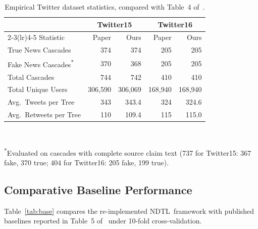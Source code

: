 \documentclass[10pt,twocolumn,a4paper]{article}
\newcommand{\NDTL}{\textsc{NDTL}}
\begin{document}
\begin{table}[t]
\centering
\caption{Empirical Twitter dataset statistics, compared with Table~4 of~\cite{fionda2025}.}
\label{tab:data}
\scriptsize
\setlength{\tabcolsep}{2.5pt}
\begin{tabular}{lrrrr}
\toprule
 & \multicolumn{2}{c}{Twitter15} & \multicolumn{2}{c}{Twitter16}\\
\cmidrule(lr){2-3}\cmidrule(lr){4-5}
Statistic & Paper & Ours & Paper & Ours\\
\midrule
True News Cascades & 374 & 374 & 205 & 205\\
Fake News Cascades\textsuperscript{*} & 370 & 368 & 205 & 205\\
Total Cascades & 744 & 742 & 410 & 410\\
Total Unique Users & 306,590 & 306,069 & 168,940 & 168,940\\
Avg.\ Tweets per Tree & 343 & 343.4 & 324 & 324.6\\
Avg.\ Retweets per Tree & 110 & 109.4 & 115 & 115.0\\
\bottomrule
\end{tabular}\\[2pt]
\raggedright \textsuperscript{*}\tiny Evaluated on cascades with complete source claim text (737 for Twitter15: 367 fake, 370 true; 404 for Twitter16: 205 fake, 199 true).
\end{table}
 
\subsection{Comparative Baseline Performance}
Table~\ref{tab:base} compares the re-implemented \NDTL\ framework with published baselines reported in Table~5 of~\cite{fionda2025} under 10-fold cross-validation.
 
\end{document}
